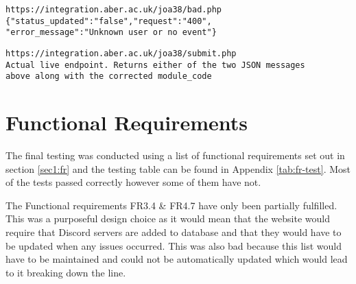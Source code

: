 \begin{verbatim}
https://integration.aber.ac.uk/joa38/bad.php
{"status_updated":"false","request":"400",
"error_message":"Unknown user or no event"}
\end{verbatim}

\begin{verbatim}
https://integration.aber.ac.uk/joa38/submit.php
Actual live endpoint. Returns either of the two JSON messages 
above along with the corrected module_code
\end{verbatim}

\section{Functional Requirements}\label{sec4:fr}
The final testing was conducted using a list of functional requirements set out in section \ref{sec1:fr} and the testing table can be found in Appendix \ref{tab:fr-test}. Most of the tests passed correctly however some of them have not.

The Functional requirements FR3.4 \& FR4.7 have only been partially fulfilled. This was a purposeful design choice as it would mean that the website would require that Discord servers are added to database and that they would have to be updated when any issues occurred. This was also bad because this list would have to be maintained and could not be automatically updated which would lead to it breaking down the line.